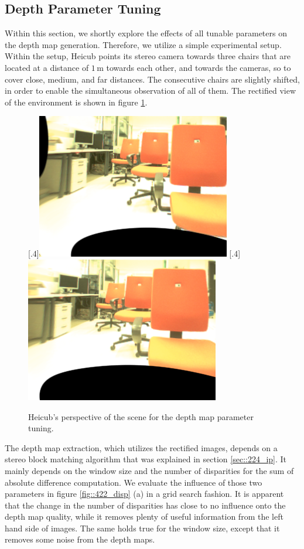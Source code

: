\subsection{Depth Parameter Tuning}
\label{sec::422_dp}
Within this section, we shortly explore the effects of all tunable parameters on the depth map generation. Therefore, we utilize a simple experimental setup. Within the setup, Heicub points its stereo camera towards three chairs that are located at a distance of $1\,\text{m}$ towards each other, and towards the cameras, so to cover close, medium, and far distances. The consecutive chairs are slightly shifted, in order to enable the simultaneous observation of all of them. The rectified view of the environment is shown in figure \ref{fig::422_wls_rgb}.
\begin{figure}[h!]
	\centering
	[.4\linewidth]{\includegraphics[scale=.3]{chapters/04_experiments/02_autonomous_walking/02_depth_map_parameter_tuning/l_rgb.png}}
	[.4\linewidth]{\includegraphics[scale=.3]{chapters/04_experiments/02_autonomous_walking/02_depth_map_parameter_tuning/r_rgb.png}}
	\caption{Heicub's perspective of the scene for the depth map parameter tuning.}
	\label{fig::422_wls_rgb}
\end{figure}
The depth map extraction, which utilizes the rectified images, depends on a stereo block matching algorithm that was explained in section \ref{sec::224_ip}. It mainly depends on the window size and the number of disparities for the sum of absolute difference computation. We evaluate the influence of those two parameters in figure \ref{fig::422_disp} (a) in a grid search fashion. It is apparent that the change in the number of disparities has close to no influence onto the depth map quality, while it removes plenty of useful information from the left hand side of images. The same holds true for the window size, except that it removes some noise from the depth maps.
